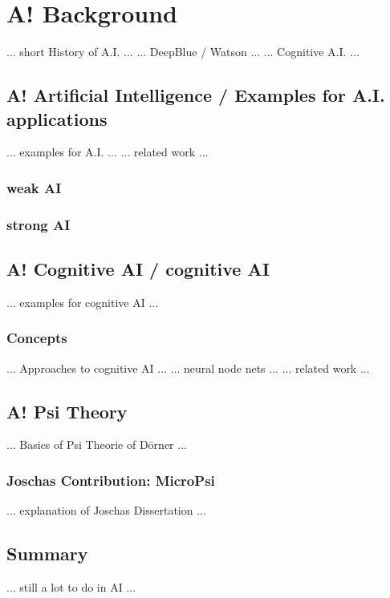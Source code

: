 \chapter{A! Background}

... short History of A.I. ...
... DeepBlue / Watson ...
... Cognitive A.I. ...

\section{A! Artificial Intelligence / Examples for A.I. applications}
... examples for A.I. ...
... related work ...

\subsection{weak AI}

\subsection{strong AI}

\section{A! Cognitive AI / cognitive AI}
... examples for cognitive AI ...

\subsection{Concepts}

... Approaches to cognitive AI ...
... neural node nets ...
... related work ...

\section{A! Psi Theory}
... Basics of Psi Theorie of Dörner ...

\subsection{Joschas Contribution: MicroPsi}
... explanation of Joschas Dissertation ...

\section{Summary}
... still a lot to do in AI ...